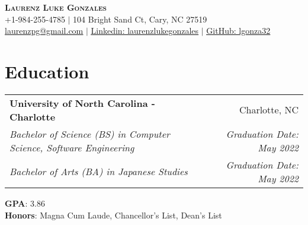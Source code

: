 \documentclass[letterpaper,11pt]{article}
\makeatletter
\newcommand{\resumeEdu}[6]{
  \vspace{-2pt}\item
    \begin{tabular*}{0.97\textwidth}[t]{l@{\extracolsep{\fill}}r}
      \textbf{#1} & #2 \\
      \textit{\small#3} & \textit{\small #4} \\
      \textit{\small#5} & \textit{\small #6} \\
    \end{tabular*}\vspace{-7pt}
}
\newcommand{\resumeSubHeadingListStart}{\begin{itemize}[leftmargin=0.15in, label={}]}
\newcommand{\resumeSubHeadingListEnd}{\end{itemize}}
\makeatother
\begin{document}

\begin{center}
    \textbf{\Huge \scshape Laurenz Luke Gonzales} \\ \vspace{1pt}
    \small +1-984-255-4785 $|$ 104 Bright Sand Ct, Cary, NC 27519 \\
    \href{mailto:laurenzpg@gmail.com}{\underline{laurenzpg@gmail.com}} $|$ 
    \href{https://linkedin.com/in/laurenzlukegonzales}{\underline{Linkedin: laurenzlukegonzales}} $|$
    \href{https://github.com/lgonza32}{\underline{GitHub: lgonza32}} 
\end{center}


\section{Education}
  \resumeSubHeadingListStart
    \resumeEdu
      {University of North Carolina - Charlotte}{Charlotte, NC}
      {Bachelor of Science (BS) in Computer Science, Software Engineering}{Graduation Date: May 2022}
      {Bachelor of Arts (BA) in Japanese Studies}{Graduation Date: May 2022}
    \small{\item{
      \textbf{GPA}{: 3.86} \\
      \textbf{Honors}{: Magna Cum Laude, Chancellor's List, Dean's List} \\
      }}
  \resumeSubHeadingListEnd

\end{document}
